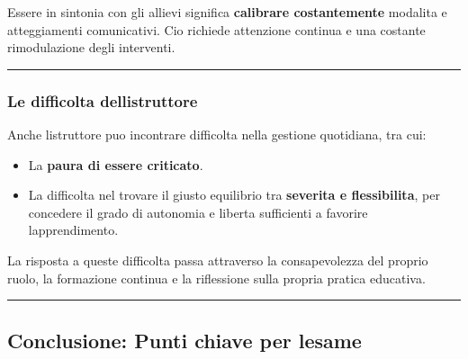 \documentclass[a4paper,11pt]{article}
\providecommand{\tightlist}{%
  \setlength{\itemsep}{0pt}\setlength{\parskip}{0pt}}
\begin{document}
Essere in sintonia con gli allievi significa \textbf{calibrare
      costantemente} modalita e atteggiamenti comunicativi. Cio richiede
attenzione continua e una costante rimodulazione degli interventi.

\begin{center}\rule{0.5\linewidth}{0.5pt}\end{center}

\subsubsection{Le difficolta
      dell\textquotesingle istruttore}\label{le-difficolta-dellistruttore}

Anche l\textquotesingle istruttore puo incontrare difficolta nella
gestione quotidiana, tra cui:

\begin{itemize}
      \tightlist
      \item
            La \textbf{paura di essere criticato}.
      \item
            La difficolta nel trovare il giusto equilibrio tra \textbf{severita e
                  flessibilita}, per concedere il grado di autonomia e liberta
            sufficienti a favorire l\textquotesingle apprendimento.
\end{itemize}

La risposta a queste difficolta passa attraverso la consapevolezza del
proprio ruolo, la formazione continua e la riflessione sulla propria
pratica educativa.

\begin{center}\rule{0.5\linewidth}{0.5pt}\end{center}

\subsection{Conclusione: Punti chiave per
      l\textquotesingle esame}\label{conclusione-punti-chiave-per-lesame-1}
\end{document}
